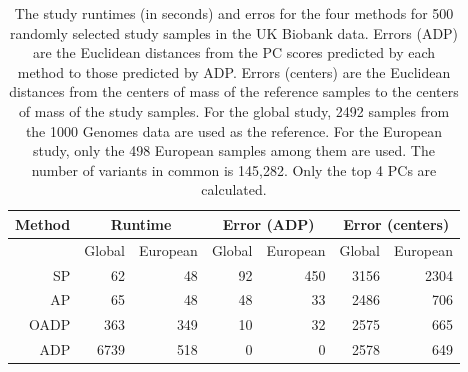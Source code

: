 \documentclass{article}
\begin{document}
\begin{table}[H]
  \centering
  \begin{tabular}{|r|r|r|r|r|r|r|}
    \hline
    Method & \multicolumn{2}{|c|}{Runtime} & \multicolumn{2}{|c|}{Error (ADP)} & \multicolumn{2}{|c|}{Error (centers)} \\
    \hline
    & Global & European & Global & European & Global & European \\
    \hline
    SP         &  62   & 48  & 92  & 450 & 3156 & 2304 \\ 
    AP         &  65   & 48  & 48  & 33  & 2486 & 706  \\
    OADP       &  363  & 349 & 10  & 32  & 2575 & 665  \\
    ADP        &  6739 & 518 & 0   & 0   & 2578 & 649  \\
    \hline
  \end{tabular}
  \caption{
    The study runtimes (in seconds) and erros for the four methods
    for 500 randomly selected study samples
    in the UK Biobank data.
    Errors (ADP) are the Euclidean distances from
    the PC scores predicted by each method
    to those predicted by ADP.
    Errors (centers) are the Euclidean distances
    from the centers of mass of the reference samples
    to the centers of mass of the study samples.
    For the global study,
    2492 samples from the 1000 Genomes data are used as the reference.
    For the European study,
    only the 498 European samples among them are used.
    The number of variants in common is 145,282.
    Only the top 4 PCs are calculated.
    }
\end{table}
\end{document}
